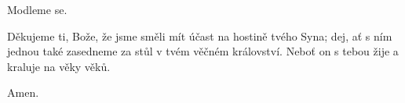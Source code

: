 \mbox{}

Modleme se.

Děkujeme ti, Bože, že jsme směli mít účast na hostině tvého Syna; dej, ať s ním jednou také zasedneme za stůl v tvém věčném království. Neboť on s tebou žije a kraluje na věky věků.

\Rbardot{} Amen.
